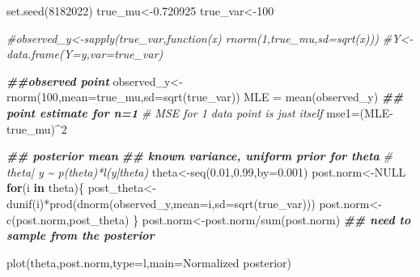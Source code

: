 \documentclass[
]{book}
\newenvironment{Shaded}{\begin{snugshade}}{\end{snugshade}}
\newcommand{\AttributeTok}[1]{\textcolor[rgb]{0.77,0.63,0.00}{#1}}
\newcommand{\CommentTok}[1]{\textcolor[rgb]{0.56,0.35,0.01}{\textit{#1}}}
\newcommand{\ConstantTok}[1]{\textcolor[rgb]{0.00,0.00,0.00}{#1}}
\newcommand{\ControlFlowTok}[1]{\textcolor[rgb]{0.13,0.29,0.53}{\textbf{#1}}}
\newcommand{\DecValTok}[1]{\textcolor[rgb]{0.00,0.00,0.81}{#1}}
\newcommand{\DocumentationTok}[1]{\textcolor[rgb]{0.56,0.35,0.01}{\textbf{\textit{#1}}}}
\newcommand{\FloatTok}[1]{\textcolor[rgb]{0.00,0.00,0.81}{#1}}
\newcommand{\FunctionTok}[1]{\textcolor[rgb]{0.00,0.00,0.00}{#1}}
\newcommand{\NormalTok}[1]{#1}
\newcommand{\OtherTok}[1]{\textcolor[rgb]{0.56,0.35,0.01}{#1}}
\newcommand{\SpecialCharTok}[1]{\textcolor[rgb]{0.00,0.00,0.00}{#1}}
\newcommand{\StringTok}[1]{\textcolor[rgb]{0.31,0.60,0.02}{#1}}
\theoremstyle{definition}
\theoremstyle{definition}
\theoremstyle{definition}
\theoremstyle{definition}
\theoremstyle{remark}
\begin{document}
\begin{Shaded}
\begin{Highlighting}[]
  \FunctionTok{set.seed}\NormalTok{(}\DecValTok{8182022}\NormalTok{)}
\NormalTok{ true\_mu}\OtherTok{\textless{}{-}}\FloatTok{0.720925}
\NormalTok{ true\_var}\OtherTok{\textless{}{-}}\DecValTok{100}
   
 \CommentTok{\#observed\_y\textless{}{-}sapply(true\_var,function(x) rnorm(1,true\_mu,sd=sqrt(x)))}
 \CommentTok{\#Y\textless{}{-}data.frame(Y=y,var=true\_var)}
 
 \DocumentationTok{\#\#observed point}
\NormalTok{ observed\_y}\OtherTok{\textless{}{-}}\FunctionTok{rnorm}\NormalTok{(}\DecValTok{100}\NormalTok{,}\AttributeTok{mean=}\NormalTok{true\_mu,}\AttributeTok{sd=}\FunctionTok{sqrt}\NormalTok{(true\_var)) }
\NormalTok{ MLE }\OtherTok{=} \FunctionTok{mean}\NormalTok{(observed\_y) }\DocumentationTok{\#\# point estimate for n=1}
 \CommentTok{\# MSE for 1 data point is just itself}
\NormalTok{  mse1}\OtherTok{=}\NormalTok{(MLE}\SpecialCharTok{{-}}\NormalTok{true\_mu)}\SpecialCharTok{\^{}}\DecValTok{2}
  
  
  \DocumentationTok{\#\# posterior mean }
  \DocumentationTok{\#\# known variance, uniform prior for theta}
   \CommentTok{\# theta| y \textasciitilde{} p(theta)*l(y|theta)}
\NormalTok{  theta}\OtherTok{\textless{}{-}}\FunctionTok{seq}\NormalTok{(}\FloatTok{0.01}\NormalTok{,}\FloatTok{0.99}\NormalTok{,}\AttributeTok{by=}\FloatTok{0.001}\NormalTok{)}
\NormalTok{  post.norm}\OtherTok{\textless{}{-}}\ConstantTok{NULL}
  \ControlFlowTok{for}\NormalTok{(i }\ControlFlowTok{in}\NormalTok{ theta)\{}
\NormalTok{  post\_theta}\OtherTok{\textless{}{-}}\FunctionTok{dunif}\NormalTok{(i)}\SpecialCharTok{*}\FunctionTok{prod}\NormalTok{(}\FunctionTok{dnorm}\NormalTok{(observed\_y,}\AttributeTok{mean=}\NormalTok{i,}\AttributeTok{sd=}\FunctionTok{sqrt}\NormalTok{(true\_var)))}
\NormalTok{  post.norm}\OtherTok{\textless{}{-}}\FunctionTok{c}\NormalTok{(post.norm,post\_theta)}
\NormalTok{  \}}
\NormalTok{   post.norm}\OtherTok{\textless{}{-}}\NormalTok{post.norm}\SpecialCharTok{/}\FunctionTok{sum}\NormalTok{(post.norm)}
  \DocumentationTok{\#\# need to sample from the posterior}
 
 \FunctionTok{plot}\NormalTok{(theta,post.norm,}\AttributeTok{type=}\StringTok{\textquotesingle{}l\textquotesingle{}}\NormalTok{,}\AttributeTok{main=}\StringTok{\textquotesingle{}Normalized posterior\textquotesingle{}}\NormalTok{)}
\end{Highlighting}
\end{Shaded}
\end{document}
